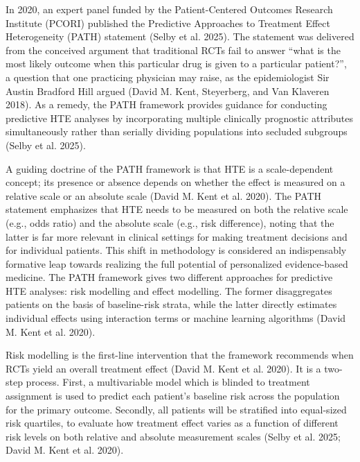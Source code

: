 \documentclass{article}
\begin{document}
In 2020, an expert panel funded by the Patient-Centered Outcomes
Research Institute (PCORI) published the Predictive Approaches to
Treatment Effect Heterogeneity (PATH) statement (Selby et al. 2025). The
statement was delivered from the conceived argument that traditional
RCTs fail to answer ``what is the most likely outcome when this
particular drug is given to a particular patient?'', a question that one
practicing physician may raise, as the epidemiologist Sir Austin
Bradford Hill argued (David M. Kent, Steyerberg, and Van Klaveren 2018).
As a remedy, the PATH framework provides guidance for conducting
predictive HTE analyses by incorporating multiple clinically prognostic
attributes simultaneously rather than serially dividing populations into
secluded subgroups (Selby et al. 2025).

A guiding doctrine of the PATH framework is that HTE is a
scale-dependent concept; its presence or absence depends on whether the
effect is measured on a relative scale or an absolute scale (David M.
Kent et al. 2020). The PATH statement emphasizes that HTE needs to be
measured on both the relative scale (e.g., odds ratio) and the absolute
scale (e.g., risk difference), noting that the latter is far more
relevant in clinical settings for making treatment decisions and for
individual patients. This shift in methodology is considered an
indispensably formative leap towards realizing the full potential of
personalized evidence-based medicine. The PATH framework gives two
different approaches for predictive HTE analyses: risk modelling and
effect modelling. The former disaggregates patients on the basis of
baseline-risk strata, while the latter directly estimates individual
effects using interaction terms or machine learning algorithms (David M.
Kent et al. 2020).

Risk modelling is the first-line intervention that the framework
recommends when RCTs yield an overall treatment effect (David M. Kent et
al. 2020). It is a two-step process. First, a multivariable model which
is blinded to treatment assignment is used to predict each patient's
baseline risk across the population for the primary outcome. Secondly,
all patients will be stratified into equal-sized risk quartiles, to
evaluate how treatment effect varies as a function of different risk
levels on both relative and absolute measurement scales (Selby et al.
2025; David M. Kent et al. 2020).
\end{document}
